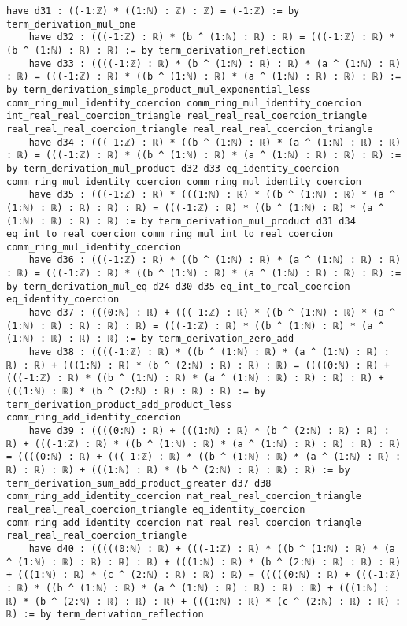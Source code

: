 \documentclass{article}
\begin{document}
\begin{tcolorbox}[colback=white!10, width=\linewidth]
\begin{lstlisting}[language=Lean4]
    have d31 : ((-1:ℤ) * ((1:ℕ) : ℤ) : ℤ) = (-1:ℤ) := by term_derivation_mul_one
    have d32 : (((-1:ℤ) : ℝ) * (b ^ (1:ℕ) : ℝ) : ℝ) = (((-1:ℤ) : ℝ) * (b ^ (1:ℕ) : ℝ) : ℝ) := by term_derivation_reflection
    have d33 : ((((-1:ℤ) : ℝ) * (b ^ (1:ℕ) : ℝ) : ℝ) * (a ^ (1:ℕ) : ℝ) : ℝ) = (((-1:ℤ) : ℝ) * ((b ^ (1:ℕ) : ℝ) * (a ^ (1:ℕ) : ℝ) : ℝ) : ℝ) := by term_derivation_simple_product_mul_exponential_less comm_ring_mul_identity_coercion comm_ring_mul_identity_coercion int_real_real_coercion_triangle real_real_real_coercion_triangle real_real_real_coercion_triangle real_real_real_coercion_triangle
    have d34 : (((-1:ℤ) : ℝ) * ((b ^ (1:ℕ) : ℝ) * (a ^ (1:ℕ) : ℝ) : ℝ) : ℝ) = (((-1:ℤ) : ℝ) * ((b ^ (1:ℕ) : ℝ) * (a ^ (1:ℕ) : ℝ) : ℝ) : ℝ) := by term_derivation_mul_product d32 d33 eq_identity_coercion comm_ring_mul_identity_coercion comm_ring_mul_identity_coercion
    have d35 : (((-1:ℤ) : ℝ) * (((1:ℕ) : ℝ) * ((b ^ (1:ℕ) : ℝ) * (a ^ (1:ℕ) : ℝ) : ℝ) : ℝ) : ℝ) = (((-1:ℤ) : ℝ) * ((b ^ (1:ℕ) : ℝ) * (a ^ (1:ℕ) : ℝ) : ℝ) : ℝ) := by term_derivation_mul_product d31 d34 eq_int_to_real_coercion comm_ring_mul_int_to_real_coercion comm_ring_mul_identity_coercion
    have d36 : (((-1:ℤ) : ℝ) * ((b ^ (1:ℕ) : ℝ) * (a ^ (1:ℕ) : ℝ) : ℝ) : ℝ) = (((-1:ℤ) : ℝ) * ((b ^ (1:ℕ) : ℝ) * (a ^ (1:ℕ) : ℝ) : ℝ) : ℝ) := by term_derivation_mul_eq d24 d30 d35 eq_int_to_real_coercion eq_identity_coercion
    have d37 : (((0:ℕ) : ℝ) + (((-1:ℤ) : ℝ) * ((b ^ (1:ℕ) : ℝ) * (a ^ (1:ℕ) : ℝ) : ℝ) : ℝ) : ℝ) = (((-1:ℤ) : ℝ) * ((b ^ (1:ℕ) : ℝ) * (a ^ (1:ℕ) : ℝ) : ℝ) : ℝ) := by term_derivation_zero_add
    have d38 : ((((-1:ℤ) : ℝ) * ((b ^ (1:ℕ) : ℝ) * (a ^ (1:ℕ) : ℝ) : ℝ) : ℝ) + (((1:ℕ) : ℝ) * (b ^ (2:ℕ) : ℝ) : ℝ) : ℝ) = ((((0:ℕ) : ℝ) + (((-1:ℤ) : ℝ) * ((b ^ (1:ℕ) : ℝ) * (a ^ (1:ℕ) : ℝ) : ℝ) : ℝ) : ℝ) + (((1:ℕ) : ℝ) * (b ^ (2:ℕ) : ℝ) : ℝ) : ℝ) := by term_derivation_product_add_product_less comm_ring_add_identity_coercion
    have d39 : ((((0:ℕ) : ℝ) + (((1:ℕ) : ℝ) * (b ^ (2:ℕ) : ℝ) : ℝ) : ℝ) + (((-1:ℤ) : ℝ) * ((b ^ (1:ℕ) : ℝ) * (a ^ (1:ℕ) : ℝ) : ℝ) : ℝ) : ℝ) = ((((0:ℕ) : ℝ) + (((-1:ℤ) : ℝ) * ((b ^ (1:ℕ) : ℝ) * (a ^ (1:ℕ) : ℝ) : ℝ) : ℝ) : ℝ) + (((1:ℕ) : ℝ) * (b ^ (2:ℕ) : ℝ) : ℝ) : ℝ) := by term_derivation_sum_add_product_greater d37 d38 comm_ring_add_identity_coercion nat_real_real_coercion_triangle real_real_real_coercion_triangle eq_identity_coercion comm_ring_add_identity_coercion nat_real_real_coercion_triangle real_real_real_coercion_triangle
    have d40 : (((((0:ℕ) : ℝ) + (((-1:ℤ) : ℝ) * ((b ^ (1:ℕ) : ℝ) * (a ^ (1:ℕ) : ℝ) : ℝ) : ℝ) : ℝ) + (((1:ℕ) : ℝ) * (b ^ (2:ℕ) : ℝ) : ℝ) : ℝ) + (((1:ℕ) : ℝ) * (c ^ (2:ℕ) : ℝ) : ℝ) : ℝ) = (((((0:ℕ) : ℝ) + (((-1:ℤ) : ℝ) * ((b ^ (1:ℕ) : ℝ) * (a ^ (1:ℕ) : ℝ) : ℝ) : ℝ) : ℝ) + (((1:ℕ) : ℝ) * (b ^ (2:ℕ) : ℝ) : ℝ) : ℝ) + (((1:ℕ) : ℝ) * (c ^ (2:ℕ) : ℝ) : ℝ) : ℝ) := by term_derivation_reflection

\end{lstlisting}
\end{tcolorbox}
\end{document}
